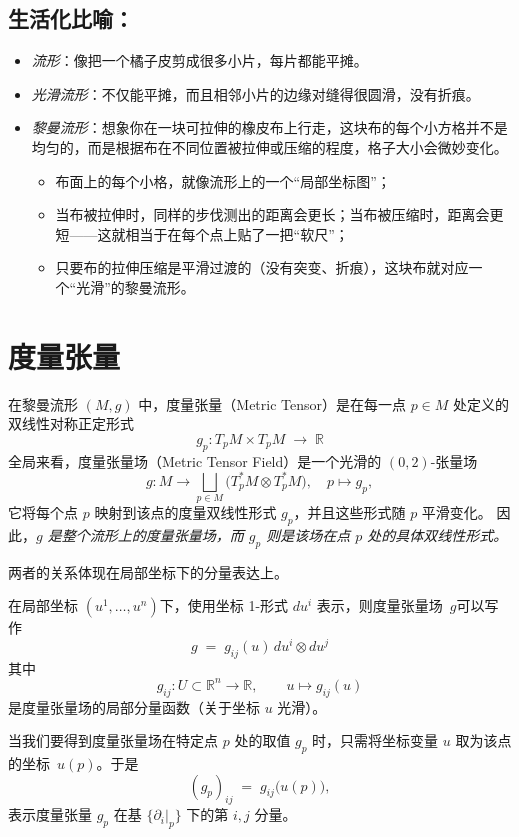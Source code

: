 \subsection*{生活化比喻：}
\begin{itemize}
  \item \emph{流形}：像把一个橘子皮剪成很多小片，每片都能平摊。  
  \item \emph{光滑流形}：不仅能平摊，而且相邻小片的边缘对缝得很圆滑，没有折痕。
  \item \emph{黎曼流形}：想象你在一块可拉伸的橡皮布上行走，这块布的每个小方格并不是均匀的，而是根据布在不同位置被拉伸或压缩的程度，格子大小会微妙变化。
\begin{itemize}
  \item 布面上的每个小格，就像流形上的一个“局部坐标图”；  
  \item 当布被拉伸时，同样的步伐测出的距离会更长；当布被压缩时，距离会更短——这就相当于在每个点上贴了一把“软尺”；  
  \item 只要布的拉伸压缩是平滑过渡的（没有突变、折痕），这块布就对应一个“光滑”的黎曼流形。  
\end{itemize}
 \end{itemize}
 
 \section{度量张量}
在黎曼流形 \((M,g)\) 中，度量张量（Metric Tensor）是在每一点 \(p\in M\) 处定义的双线性对称正定形式
\[
g_p: T_pM \times T_pM \;\longrightarrow\; \mathbb{R}
\]
全局来看，度量张量场（Metric Tensor Field）是一个光滑的 \((0,2)\)-张量场
\[
g: M \longrightarrow \bigsqcup_{p\in M}\bigl(T_p^*M\otimes T_p^*M\bigr),
\quad
p\mapsto g_p,
\]
它将每个点 \(p\) 映射到该点的度量双线性形式 \(g_p\)，并且这些形式随 \(p\) 平滑变化。
因此，\emph{$g$ 是整个流形上的度量张量场，而 $g_p$ 则是该场在点 $p$ 处的具体双线性形式。}

两者的关系体现在局部坐标下的分量表达上。

在局部坐标 \((u^1,\dots,u^n)\)下，使用坐标 1-形式 \(du^i\) 表示，则度量张量场~$g$可以写作
\[
g \;=\; g_{ij}(u)\,du^i \otimes du^j\]
其中
\begin{equation}\label{度量局部分量函数}
g_{ij}: U\subset\mathbb{R}^n \longrightarrow \mathbb{R},
\qquad
u\mapsto g_{ij}(u)
\end{equation}
是度量张量场的局部分量函数（关于坐标 \(u\) 光滑）。

当我们要得到度量张量场在特定点 \(p\) 处的取值 \(g_p\) 时，只需将坐标变量 \(u\) 取为该点的坐标~\(u(p)\)。于是
\[
(g_p)_{ij}
\;=\;
g_{ij}\bigl(u(p)\bigr),
\]
表示度量张量 \(g_p\) 在基 \(\{\partial_i|_p\}\) 下的第 \(i,j\) 分量。

